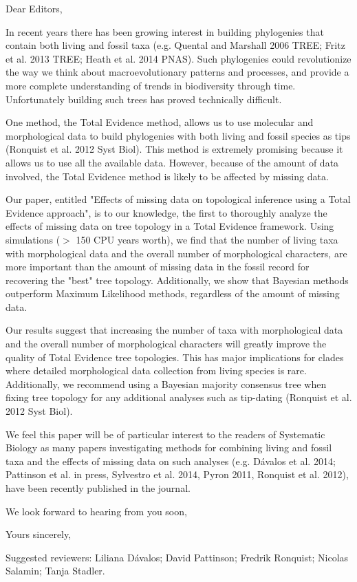 \documentclass[11pt]{letter}
\begin{document}
\begin{letter}{}
\opening{Dear Editors,}

In recent years there has been growing interest in building phylogenies that contain both living and fossil taxa (e.g. Quental and Marshall 2006 TREE; Fritz et al. 2013 TREE; Heath et al. 2014 PNAS). Such phylogenies could revolutionize the way we think about macroevolutionary patterns and processes, and provide a more complete understanding of trends in biodiversity through time. Unfortunately building such trees has proved technically difficult. 

One method, the Total Evidence method, allows us to use molecular and morphological data to build phylogenies with both living and fossil species as tips (Ronquist et al. 2012 Syst Biol). This method is extremely promising because it allows us to use all the available data. However, because of the amount of data involved, the Total Evidence method is likely to be affected by missing data.

Our paper, entitled "Effects of missing data on topological inference using a Total Evidence approach", is to our knowledge, the first to thoroughly analyze the effects of missing data on tree topology in a Total Evidence framework. Using simulations ($>$ 150 CPU years worth), we find that the number of living taxa with morphological data and the overall number of morphological characters, are more important than the amount of missing data in the fossil record for recovering the "best" tree topology. Additionally, we show that Bayesian methods outperform Maximum Likelihood methods, regardless of the amount of missing data.

Our results suggest that increasing the number of taxa with morphological data and the overall number of morphological characters will greatly improve the quality of Total Evidence tree topologies. This has major implications for clades where detailed morphological data collection from living species is rare. Additionally, we recommend using a Bayesian majority consensus tree when fixing tree topology for any additional analyses such as tip-dating (Ronquist et al. 2012 Syst Biol).

We feel this paper will be of particular interest to the readers of Systematic Biology as many papers investigating methods for combining living and fossil taxa and the effects of missing data on such analyses (e.g. D\'{a}valos et al. 2014; Pattinson et al. in press, Sylvestro et al. 2014, Pyron 2011, Ronquist et al. 2012), have been recently published in the journal.

We look forward to hearing from you soon,

\closing{Yours sincerely,}

Suggested reviewers: Liliana D\'{a}valos; David Pattinson; Fredrik Ronquist; Nicolas Salamin; Tanja Stadler.

\end{letter}
\end{document}
